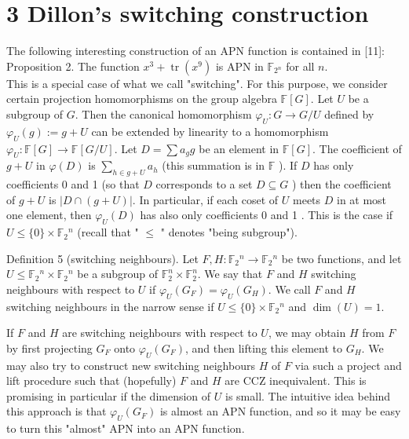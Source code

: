 \documentclass[10pt]{article}
\begin{document}
\section*{3 Dillon's switching construction}
The following interesting construction of an APN function is contained in [11]:\\
Proposition 2. The function $x^{3}+\operatorname{tr}\left(x^{9}\right)$ is APN in $\mathbb{F}_{2^{n}}$ for all $n$.\\
This is a special case of what we call "switching". For this purpose, we consider certain projection homomorphisms on the group algebra $\mathbb{F}[G]$. Let $U$ be a subgroup of $G$. Then the canonical homomorphism $\varphi_{U}: G \rightarrow G / U$ defined by $\varphi_{U}(g):=g+U$ can be extended by linearity to a homomorphism $\varphi_{U}: \mathbb{F}[G] \rightarrow \mathbb{F}[G / U]$. Let $D=\sum a_{g} g$ be an element in $\mathbb{F}[G]$. The coefficient of $g+U$ in $\varphi(D)$ is $\sum_{h \in g+U} a_{h}$ (this summation is in $\mathbb{F}$ ). If $D$ has only coefficients 0 and 1 (so that $D$ corresponds to a set $D \subseteq G$ ) then the coefficient of $g+U$ is $|D \cap(g+U)|$. In particular, if each coset of $U$ meets $D$ in at most one element, then $\varphi_{U}(D)$ has also only coefficients 0 and 1 . This is the case if $U \leq\{0\} \times \mathbb{F}_{2}{ }^{n}$ (recall that " $\leq$ " denotes "being subgroup").

Definition 5 (switching neighbours). Let $F, H: \mathbb{F}_{2}{ }^{n} \rightarrow \mathbb{F}_{2}{ }^{n}$ be two functions, and let $U \leq \mathbb{F}_{2}{ }^{n} \times \mathbb{F}_{2}{ }^{n}$ be a subgroup of $\mathbb{F}_{2}^{n} \times \mathbb{F}_{2}^{n}$. We say that $F$ and $H$ switching neighbours with respect to $U$ if $\varphi_{U}\left(G_{F}\right)=\varphi_{U}\left(G_{H}\right)$. We call $F$ and $H$ switching neighbours in the narrow sense if $U \leq\{0\} \times \mathbb{F}_{2}{ }^{n}$ and $\operatorname{dim}(U)=1$.

If $F$ and $H$ are switching neighbours with respect to $U$, we may obtain $H$ from $F$ by first projecting $G_{F}$ onto $\varphi_{U}\left(G_{F}\right)$, and then lifting this element to $G_{H}$. We may also try to construct new switching neighbours $H$ of $F$ via such a project and lift procedure such that (hopefully) $F$ and $H$ are CCZ inequivalent. This is promising in particular if the dimension of $U$ is small. The intuitive idea behind this approach is that $\varphi_{U}\left(G_{F}\right)$ is almost an APN function, and so it may be easy to turn this "almost" APN into an APN function.
\end{document}
